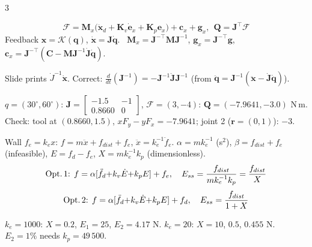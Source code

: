 \begin{multicols}{3}
\begin{fbx}
\[\boldsymbol{\mathcal F}=\mathbf M_x\big(\ddot{\mathbf x}_d+\mathbf K_v\dot{\mathbf e}_x+\mathbf K_p\mathbf e_x\big)+\mathbf c_x+\mathbf g_x,\ \ \mathbf Q=\mathbf J^\top\boldsymbol{\mathcal F}\]
Feedback $\mathbf x=\mathcal K(\mathbf q)$, $\dot{\mathbf x}=\mathbf J\dot{\mathbf q}$. \added\ $\mathbf M_x=\mathbf J^{-\top}\mathbf M\mathbf J^{-1}$, $\mathbf g_x=\mathbf J^{-\top}\mathbf g$, $\mathbf c_x=\mathbf J^{-\top}(\mathbf C-\mathbf M\mathbf J^{-1}\dot{\mathbf J}\dot{\mathbf q})$.
\end{fbx}
\begin{slideerr}[p.31]
Slide prints $\dot J^{-1}\dot{\mathbf x}$. Correct: $\tfrac d{dt}(\mathbf J^{-1})=-\mathbf J^{-1}\dot{\mathbf J}\mathbf J^{-1}$ (from $\ddot{\mathbf q}=\mathbf J^{-1}(\ddot{\mathbf x}-\dot{\mathbf J}\dot{\mathbf q})$). \chk
\end{slideerr}
\begin{worked}[$\mathbf Q=\mathbf J^\top\mathcal F$, $l_1{=}l_2{=}1$]
$q=(30^\circ,60^\circ)$: $\mathbf J=\begin{bmatrix}-1.5&-1\\0.8660&0\end{bmatrix}$, $\mathcal F=(3,-4)$: $\mathbf Q=(-7.9641,-3.0)$ N\,m. Check: tool at $(0.8660,1.5)$, $xF_y-yF_x=-7.9641$; joint 2 ($\mathbf r=(0,1)$): $-3$. \chk
\end{worked}

\begin{fbx}
Wall $f_e=k_ex$: $f=m\ddot x+f_{dist}+f_e$, $\ddot x=k_e^{-1}\ddot f_e$. $\alpha=mk_e^{-1}$ (s$^2$), $\beta=f_{dist}+f_e$ (infeasible), $E=f_d-f_e$, $X=mk_e^{-1}k_p$ (dimensionless).
\[\text{Opt.\,1: }f=\alpha[\ddot f_d{+}k_v\dot E{+}k_pE]+f_e,\quad E_{ss}=\frac{f_{dist}}{mk_e^{-1}k_p}=\frac{f_{dist}}X\]
\[\text{Opt.\,2: }f=\alpha[\ddot f_d{+}k_v\dot E{+}k_pE]+f_d,\quad E_{ss}=\frac{f_{dist}}{1+X}\]
\end{fbx}
\begin{worked}[$m=2,f_{dist}=5,k_p=100$]
$k_e=1000$: $X=0.2$, $E_1=25$, $E_2=4.17$ N. $k_e=20$: $X=10$, $0.5$, $0.455$ N. $E_2=1\%$ needs $k_p=49\,500$. \chk
\end{worked}


\end{multicols}
